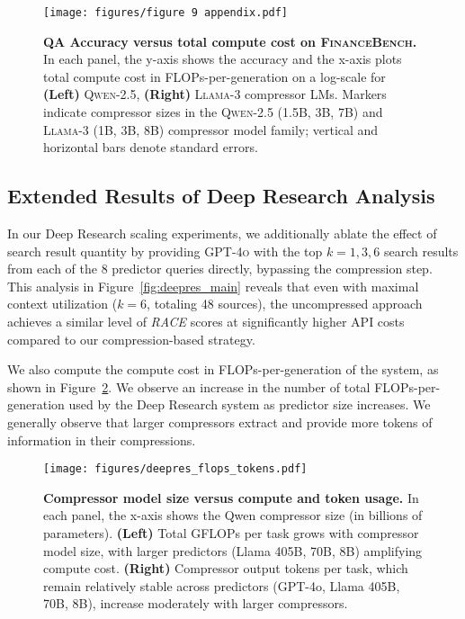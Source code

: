 \documentclass{article} %
\begin{document}
\begin{figure}[h]
    \centering
    \texttt{[image: figures/figure 9 appendix.pdf]}
    \caption{\textbf{QA Accuracy versus total compute cost on \textsc{FinanceBench}.} In each panel, the y-axis shows the accuracy and the x-axis plots total compute cost in FLOPs-per-generation on a log-scale for \textbf{(Left)} \textsc{Qwen-2.5}, \textbf{(Right)} \textsc{Llama-3} compressor LMs. Markers indicate compressor sizes in the \textsc{Qwen-2.5} (1.5B, 3B, 7B) and \textsc{Llama-3} (1B, 3B, 8B)  compressor model family; vertical and horizontal bars denote standard errors.}
    \label{fig:figure-9-financebench}
\end{figure}

\subsection{Extended Results of Deep Research Analysis}
\label{sec:appendix-deep-research-analysis}

In our Deep Research scaling experiments, we additionally ablate the effect of search result quantity by providing \textsc{GPT-4o} with the top $k={1, 3, 6}$ search results from each of the 8 predictor queries directly, bypassing the compression step. This analysis in Figure~\ref{fig:deepres_main} reveals that even with maximal context utilization ($k=6$, totaling 48 sources), the uncompressed approach achieves a similar level of \textit{RACE} scores at significantly higher API costs compared to our compression-based strategy.

We also compute the compute cost in FLOPs-per-generation of the system, as shown in Figure~\ref{fig:deepres-flops-tokens}. We observe an increase in the number of total FLOPs-per-generation used by the Deep Research system as predictor size increases. We generally observe that larger compressors extract and provide more tokens of information in their compressions.

\begin{figure}[htbp]
    \centering
\texttt{[image: figures/deepres\_flops\_tokens.pdf]}
    \caption{%
    \textbf{Compressor model size versus compute and token usage.} 
    In each panel, the x-axis shows the Qwen compressor size (in billions of parameters). 
    \textbf{(Left)} Total GFLOPs per task grows with compressor model size, with larger predictors (Llama 405B, 70B, 8B) amplifying compute cost. 
    \textbf{(Right)} Compressor output tokens per task, which remain relatively stable across predictors (GPT-4o, Llama 405B, 70B, 8B), increase moderately with larger compressors.}
    \label{fig:deepres-flops-tokens}
\end{figure}
\end{document}

